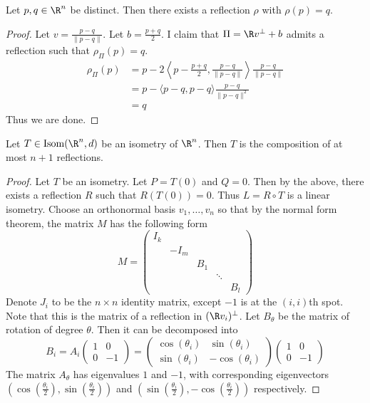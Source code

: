\documentclass[a4paper]{article}
\begin{document}
\begin{lmm}{}{} Let $p,q\in\R^n$ be distinct. Then there exists a reflection $\rho$ with $\rho(p)=q$. \tcbline
\begin{proof}
Let $v=\frac{p-q}{\|p-q\|}$. Let $b=\frac{p+q}{2}$. I claim that $\Pi=\R v^\perp+b$ admits a reflection such that $\rho_\Pi(p)=q$. 
\begin{align*}
\rho_\Pi(p)&=p-2\left\langle p-\frac{p+q}{2},\frac{p-q}{\|p-q\|}\right\rangle \frac{p-q}{\|p-q\|}\\
&=p-\langle p-q,p-q\rangle\frac{p-q}{\|p-q\|^2}\\
&=q
\end{align*}
Thus we are done. 
\end{proof}
\end{lmm}

\begin{thm}{}{} Let $T\in\text{Isom}(\R^n,d)$ be an isometry of $\R^n$. Then $T$ is the composition of at most $n+1$ reflections. \tcbline
\begin{proof} Let $T$ be an isometry. Let $P=T(0)$ and $Q=0$. Then by the above, there exists a reflection $R$ such that $R(T(0))=0$. Thus $L=R\circ T$ is a linear isometry. Choose an orthonormal basis $v_1,\dots,v_n$ so that by the normal form theorem, the matrix $M$ has the following form $$M=\begin{pmatrix}
I_k &&&&\\
&-I_m&&&\\
&&B_1&&\\
&&&\ddots&\\
&&&&B_l
\end{pmatrix}$$
Denote $J_i$ to be the $n\times n$ identity matrix, except $-1$ is at the $(i,i)$th spot. Note that this is the matrix of a reflection in $(\R v_i)^\perp$. Let $B_\theta$ be the matrix of rotation of degree $\theta$. Then it can be decomposed into $$B_i=A_i\begin{pmatrix}
1 & 0\\
0 & -1
\end{pmatrix}=\begin{pmatrix}
\cos(\theta_i) & \sin(\theta_i)\\
\sin(\theta_i) & -\cos(\theta_i)
\end{pmatrix}\begin{pmatrix}
1 & 0\\
0 & -1
\end{pmatrix}$$
The matrix $A_\theta$ has eigenvalues $1$ and $-1$, with corresponding eigenvectors $\left(\cos\left(\frac{\theta_i}{2}\right),\sin\left(\frac{\theta_i}{2}\right)\right)$ and $\left(\sin\left(\frac{\theta_i}{2}\right),-\cos\left(\frac{\theta_i}{2}\right)\right)$ respectively. \linebreak\linebreak

\end{proof}
\end{thm}
\end{document}
